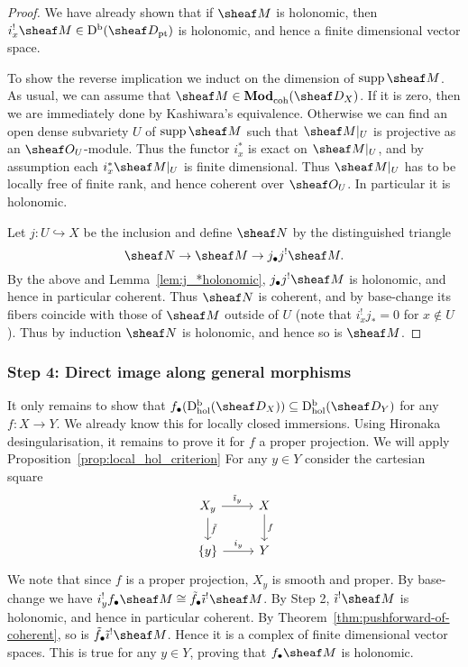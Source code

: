 \documentclass[number-in-sections,a4paper]{notes}
\begin{document}
\begin{proof}
    We have already shown that if $\sheaf M$ is holonomic, then $i_x^!\sheaf M \in \catDbDMod{\pt}$ is holonomic, and hence a finite dimensional vector space.

    To show the reverse implication we induct on the dimension of $\supp \sheaf M$.
    As usual, we can assume that $\sheaf M \in \catDModcoh{X}$.
    If it is zero, then we are immediately done by Kashiwara's equivalence.
    Otherwise we can find an open dense subvariety $U$ of $\supp\sheaf M$ such that $\res{\sheaf M}U$ is projective as an $\sO_U$-module.
    Thus the functor $i_x^*$ is exact on $\res{\sheaf M}U$, and by assumption each $i_x^*\res{\sheaf M}{U}$ is finite dimensional.
    Thus $\res{\sheaf M}{U}$ has to be locally free of finite rank, and hence coherent over $\sO_U$.
    In particular it is holonomic.

    Let $j\colon U \hookrightarrow X$ be the inclusion and define $\sheaf N$ by the distinguished triangle
    \[
        \sheaf N \to \sheaf M \to j_\bullet j^!\sheaf M.
    \]
    By the above and Lemma~\ref{lem:j_*holonomic}, $j_\bullet j^!\sheaf M$ is holonomic, and hence in particular coherent.
    Thus $\sheaf N$ is coherent, and by base-change its fibers coincide with those of $\sheaf M$ outside of $U$ (note that $i_x^!j_* = 0$ for $x \notin U$).
    Thus by induction $\sheaf N$ is holonomic, and hence so is $\sheaf M$.
\end{proof}

\subsubsection{Step 4: Direct image along general morphisms}

It only remains to show that $f_\bullet(\catDbDModhol{X}) \subseteq \catDbDModhol{Y}$ for any $f\colon X \to Y$.
We already know this for locally closed immersions.
Using Hironaka desingularisation, it remains to prove it for $f$ a proper projection.
We will apply Proposition~\ref{prop:local_hol_criterion}
For any $y \in Y$ consider the cartesian square
\[
    \begin{tikzcd}
        X_y \arrow[r, "\tilde\imath_y" ] \arrow[d, "\tilde f"] & X \arrow[d, "f"] \\
        \{y\} \arrow[r, "i_y"] & Y
    \end{tikzcd}
\]
We note that since $f$ is a proper projection, $X_y$ is smooth and proper.
By base-change we have $i_y^!f_\bullet \sheaf M \cong \tilde f_\bullet \tilde \imath^! \sheaf M$.
By Step 2, $\tilde \imath^! \sheaf M$ is holonomic, and hence in particular coherent.
By Theorem~\ref{thm:pushforward-of-coherent}, so is $\tilde f_\bullet \tilde \imath^! \sheaf M$.
Hence it is a complex of finite dimensional vector spaces.
This is true for any $y \in Y$, proving that $f_\bullet \sheaf M$ is holonomic.
\end{document}
